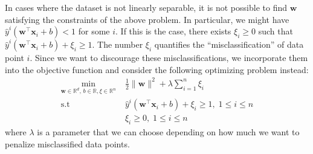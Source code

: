 \documentclass[11pt]{article}
\theoremstyle{remark}
\newcommand{\R}{\mathbb{R}}                     %
\newcommand{\bx}{\mathbf{x}}
\newcommand{\bw}{\mathbf{w}}
\begin{document}
In cases where the dataset is not linearly separable, it is not possible to
find $\bw$ satisfying the constraints of the above problem. In particular, we
might have $\hat{y}^i (\bw^\intercal\bx_i +b) < 1$ for some $i$. If this is the
case, there exists $\xi_i\geq 0$ such that $\hat{y}^i
(\bw^\intercal\bx_i +b) + \xi_i \geq 1$.
The number $\xi_i$ quantifies the ``misclassification'' of data point $i$.
Since we want to discourage these misclassifications, we incorporate them into
the objective function and consider the following optimizing problem instead:
\begin{equation}
    \label{eq:bar}
    \begin{aligned}
        \min_{\bw\in\R^d,\, b \in  \R, \xi\in\R^n}&\; \frac{1}{2}\|\bw\|^2
        + \lambda\sum_{i=1}^n\xi_i\\
        \text{s.t} &\; \hat{y}^i(\bw^\intercal\bx_i +b) + \xi_i \geq 1 ,\;1\leq i\leq n\\
                   &\; \xi_i\geq 0,\;1\leq i\leq n
    \end{aligned}
\end{equation}
where $\lambda$ is a parameter that we can choose depending on how much we want
to penalize misclassified data points.
\end{document}
